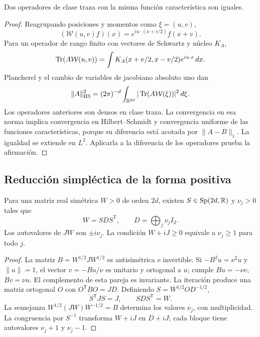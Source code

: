 \begin{lemma}
\label{app:lem:unicidad-weyl}
Dos operadores de clase traza con la misma función característica son iguales.
\end{lemma}
\begin{proof}
Reagrupando posiciones y momentos como \(\xi=(u,v)\),
\[
 (\mathcal W(u,v)f)(x)=e^{iu\cdot(x+v/2)}f(x+v).
\]
Para un operador de rango finito con vectores de Schwartz y núcleo \(K_A\),
\[
 \operatorname{Tr}(A\mathcal W(u,v))=\int K_A(x+v/2,x-v/2)e^{iu\cdot x}\,dx.
\]
Plancherel y el cambio de variables de jacobiano absoluto uno dan
\[
 \|A\|_{\rm HS}^2=(2\pi)^{-d}\int_{\mathbb R^{2d}}
 |\operatorname{Tr}(A\mathcal W(\xi))|^2\,d\xi.
\]
Los operadores anteriores son densos en clase traza. La convergencia
en esa norma implica convergencia en Hilbert--Schmidt y convergencia
uniforme de las funciones características, porque su diferencia está
acotada por \(\|A-B\|_1\). La igualdad se extiende en \(L^2\).
Aplicarla a la diferencia de los operadores prueba la afirmación.
\end{proof}

\subsection{Reducción simpléctica de la forma positiva}
\begin{theorem}
\label{app:thm:williamson}
Para una matriz real simétrica \(W>0\) de orden \(2d\), existen
\(S\in\operatorname{Sp}(2d,\mathbb R)\) y \(\nu_j>0\) tales que
\[
 W=SDS^{\mathsf T},\qquad D=\bigoplus_j\nu_jI_2.
\]
Los autovalores de \(JW\) son \(\pm i\nu_j\). La condición
\(W+iJ\geq0\) equivale a \(\nu_j\geq1\) para todo \(j\).
\end{theorem}
\begin{proof}
La matriz \(B=W^{1/2}JW^{1/2}\) es antisimétrica e invertible.
Si \(-B^2u=\nu^2u\) y \(\|u\|=1\), el vector
\(v=-Bu/\nu\) es unitario y ortogonal a \(u\); cumple
\(Bu=-\nu v\), \(Bv=\nu u\). El complemento de esta pareja es
invariante. La iteración produce una matriz ortogonal \(O\) con
\(O^{\mathsf T}BO=JD\). Definiendo \(S=W^{1/2}OD^{-1/2}\),
\[
 S^{\mathsf T}JS=J,\qquad SDS^{\mathsf T}=W.
\]
La semejanza \(W^{1/2}(JW)W^{-1/2}=B\) determina los valores
\(\nu_j\), con multiplicidad. La congruencia por \(S^{-1}\)
transforma \(W+iJ\) en \(D+iJ\); cada bloque tiene autovalores
\(\nu_j+1\) y \(\nu_j-1\).
\end{proof}

